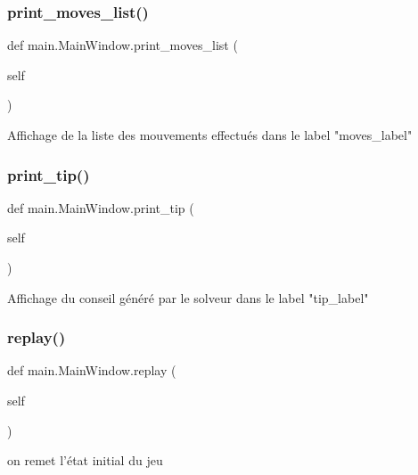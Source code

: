 \subsubsection{\texorpdfstring{print\+\_\+moves\+\_\+list()}{print\_moves\_list()}}
{\footnotesize\ttfamily def main.\+Main\+Window.\+print\+\_\+moves\+\_\+list (\begin{DoxyParamCaption}\item[{}]{self }\end{DoxyParamCaption})}

\begin{DoxyVerb}Affichage de la liste des mouvements effectués dans le label "moves_label" \end{DoxyVerb}
 \mbox{\label{classmain_1_1MainWindow_aa7696020f657685831fd5aa212c28e34}} 
\subsubsection{\texorpdfstring{print\+\_\+tip()}{print\_tip()}}
{\footnotesize\ttfamily def main.\+Main\+Window.\+print\+\_\+tip (\begin{DoxyParamCaption}\item[{}]{self }\end{DoxyParamCaption})}

\begin{DoxyVerb}Affichage du conseil généré par le solveur  dans le label "tip_label" \end{DoxyVerb}
 \mbox{\label{classmain_1_1MainWindow_ad778ae6b83bc497287aa2f86907a4615}} 
\subsubsection{\texorpdfstring{replay()}{replay()}}
{\footnotesize\ttfamily def main.\+Main\+Window.\+replay (\begin{DoxyParamCaption}\item[{}]{self }\end{DoxyParamCaption})}

\begin{DoxyVerb}on remet l'état initial du jeu \end{DoxyVerb}
 \mbox{\label{classmain_1_1MainWindow_a208742a5aac99355ae19aee19e9f6419}} 

